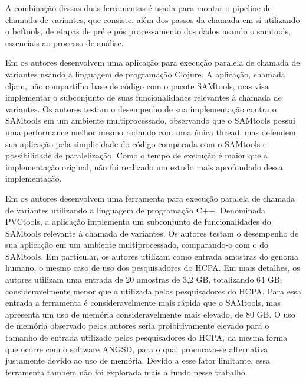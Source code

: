 \documentclass[cic,tc]{iiufrgs}
\begin{document}
A combinação dessas duas ferramentas é usada para montar o pipeline de chamada
de variantes, que consiste, além dos passos da chamada em si utilizando o
bcftools, de etapas de pré e pós processamento dos dados usando o samtools,
essenciais ao processo de análise.

Em \cite{takeuchi2016cljam} os autores desenvolvem uma aplicação para execução
paralela de chamada de variantes usando a linguagem de programação Clojure. A
aplicação, chamada cljam, não compartilha base de código com o pacote SAMtools,
mas visa implementar o subconjunto de suas funcionalidades relevantes à
chamada de variantes. Os autores testam o desempenho de sua implementação
contra o SAMtools em um ambiente multiprocessado, observando que o SAMtools
possui uma performance melhor mesmo rodando com uma única thread, mas defendem
sua aplicação pela simplicidade do código comparada com o SAMtools e
possibilidade de paralelização. Como o tempo de execução é maior que a
implementação original, não foi realizado um estudo mais aprofundado dessa
implementação.

Em \cite{jin2019pvctools} os autores desenvolvem uma ferramenta para execução
paralela de chamada de variantes utilizando a linguagem de programação C++.
Denominada PVCtools, a aplicação implementa um subconjunto de funcionalidades
do SAMtools relevante à chamada de variantes. Os autores testam o desempenho de
sua aplicação em um ambiente multiprocessado, comparando-o com o do SAMtools.
Em particular, os autores utilizam como entrada amostras do genoma humano,
o mesmo caso de uso dos pesquisadores do HCPA. Em mais detalhes, os
autores utilizam uma entrada de 20 amostras de 3,2 GB, totalizando 64 GB,
consideravelmente menor que a utilizada pelos pesquisadores do HCPA. Para essa
entrada a ferramenta é consideravelmente mais rápida que o SAMtools, mas
apresenta um uso de memória consideravelmente mais elevado, de 80 GB. O uso de
memória observado pelos autores seria proibitivamente elevado para o tamanho de
entrada utilizado pelos pesquisadores do HCPA, da mesma forma que ocorre com o
software ANGSD, para o qual procurava-se alternativa justamente devido ao uso
de memória. Devido a esse fator limitante, essa ferramenta também não foi
explorada mais a fundo nesse trabalho.
\end{document}
